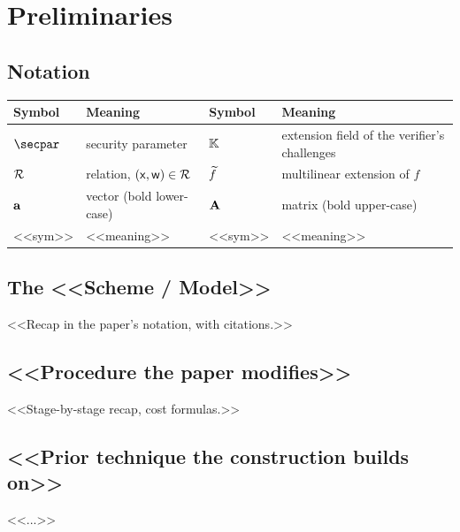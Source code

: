\section{Preliminaries}\label{sec:prelim}
\subsection{Notation}
\begin{table}[h]
\centering\scriptsize
\begin{tabular}{@{}ll@{\qquad}ll@{}}
\toprule
Symbol & Meaning & Symbol & Meaning \\
\midrule
$\secpar$ & security parameter & $\mathbb{K}$ & extension field of the verifier's challenges \\
$\mathcal{R}$ & relation, $(\mathsf{x},\mathsf{w})\in\mathcal{R}$ & $\widetilde{f}$ & multilinear extension of $f$ \\
$\mathbf{a}$ & vector (bold lower-case) & $\mathbf{A}$ & matrix (bold upper-case) \\
<<sym>> & <<meaning>> & <<sym>> & <<meaning>> \\
\bottomrule
\end{tabular}
\end{table}

\subsection{The <<Scheme / Model>>}
<<Recap in the paper's notation, with citations.>>

\subsection{<<Procedure the paper modifies>>}
<<Stage-by-stage recap, cost formulas.>>

\subsection{<<Prior technique the construction builds on>>}
\begin{definition}[<<name>>]\label{def:prior}
<<...>>
\end{definition}
